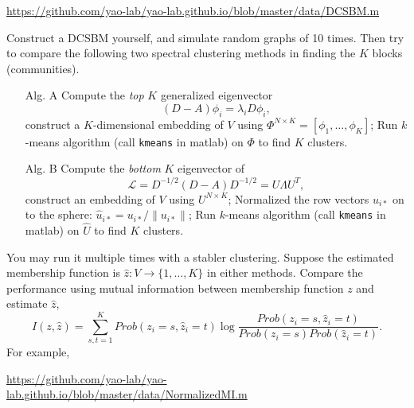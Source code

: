\documentclass[11pt]{article}
\def\Ln{{\mathcal L}}
\def\E{{\mathbb E}}
\begin{document}
\begin{enumerate}
\url{https://github.com/yao-lab/yao-lab.github.io/blob/master/data/DCSBM.m} 

Construct a DCSBM yourself, and simulate random graphs of 10 times. Then try to compare the following two spectral clustering methods in finding the $K$ blocks (communities).  
\begin{enumerate}
\item[Alg. A]
\subitem[1] Compute the \emph{top} $K$ generalized eigenvector $$(D - A) \phi_i = \lambda_i D \phi_i,$$ construct a $K$-dimensional embedding of $V$ using $\Phi^{N\times K} = [\phi_1, \ldots, \phi_K]$; 
\subitem[2] Run $k$-means algorithm (call {\tt{kmeans}} in matlab) on $\Phi$ to find $K$ clusters.
\item[Alg. B]
\subitem[1] Compute the \emph{bottom} $K$ eigenvector of $$\Ln = D^{-1/2}(D-A)D^{-1/2} = U \Lambda U^T,$$ construct an embedding of $V$ using $U^{N\times K}$;
\subitem[2] Normalized the row vectors $u_{i\ast}$ on to the sphere: $\hat{u}_{i\ast} = u_{i\ast}/\|u_{i\ast}\|$;
\subitem[3] Run $k$-means algorithm (call {\tt{kmeans}} in matlab) on $\hat{U}$ to find $K$ clusters.
\end{enumerate} 

You may run it multiple times with a stabler clustering. Suppose the estimated membership function is $\hat{z}: V\to \{1,\ldots,K\}$ in either methods. Compare the performance using mutual information between membership function $z$ and estimate $\hat{z}$,
\begin{equation}
I(z, \hat{z}) = \sum_{s,t=1}^K Prob(z_i = s, \hat{z}_i=t) \log \frac{Prob(z_i=s, \hat{z}_i=t)}{Prob(z_i= s) Prob(\hat{z}_i= t)}.
\end{equation}
For example, 

\url{https://github.com/yao-lab/yao-lab.github.io/blob/master/data/NormalizedMI.m}





%
%


\end{enumerate}
\end{document}
